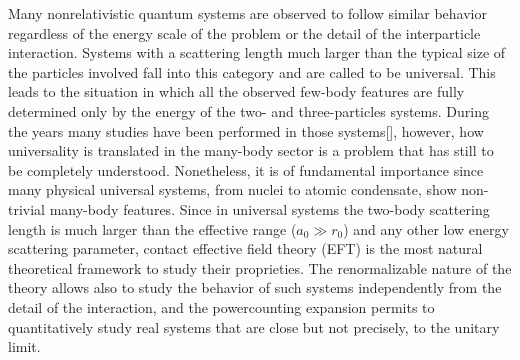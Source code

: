 \documentclass[preprint,12pt]{elsarticle}
\begin{document}
Many nonrelativistic quantum systems are observed to follow similar behavior regardless of the energy scale of the problem or the detail of the interparticle interaction.
Systems with a scattering length much larger than the typical size of the particles involved fall into this category and are called to be universal.
This leads to the situation in which all the observed few-body features are fully determined only by the energy of the two- and three-particles systems.
During the years many studies have been performed in those systems[], however, how universality is translated in the many-body sector is a problem that has still to be completely understood.
Nonetheless, it is of fundamental importance since many physical universal systems, from nuclei to atomic condensate, show non-trivial many-body features.
Since in universal systems the two-body scattering length is much larger than the effective range ($a_0\gg r_0$) and any other low energy scattering parameter, contact effective field theory (EFT) is the most natural theoretical framework to study their proprieties.
The renormalizable nature of the theory allows also to study the behavior of such systems independently from the detail of the interaction, and the powercounting expansion permits to quantitatively study real systems that are close but not precisely, to the unitary limit.
\end{document}
